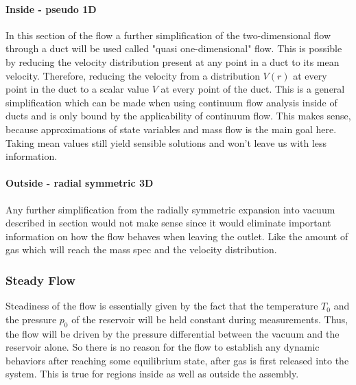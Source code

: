 	\paragraph{Inside - pseudo 1D}

		In this section of the flow a further simplification of the two-dimensional flow through a duct will be used called "quasi one-dimensional" flow.
		This is possible by reducing the velocity distribution present at any point in a duct to its mean velocity.
		Therefore, reducing the velocity from a distribution $V(r)$ at every point in the duct to a scalar value $V$ at every point of the duct.
		This is a general simplification which can be made when using continuum flow analysis inside of ducts and is only bound by the applicability of continuum flow.
		This makes sense, because approximations of state variables and mass flow is the main goal here.
		Taking mean values still yield sensible solutions and won't leave us with less information.

	\paragraph{Outside - radial symmetric 3D}

		Any further simplification from the radially symmetric expansion into vacuum described in section would not make sense since it would eliminate important information on how the flow behaves when leaving the outlet.
		Like the amount of gas which will reach the mass spec and the velocity distribution.
\cite{anderson2021modern}

\subsubsection{Steady Flow}

	Steadiness of the flow is essentially given by the fact that the temperature $T_0$ and the pressure $p_0$ of the reservoir will be held constant during measurements.
	Thus, the flow will be driven by the pressure differential between the vacuum and the reservoir alone.
	So there is no reason for the flow to establish any dynamic behaviors after reaching some equilibrium state, after gas is first released into the system.
	This is true for regions inside as well as outside the assembly.
